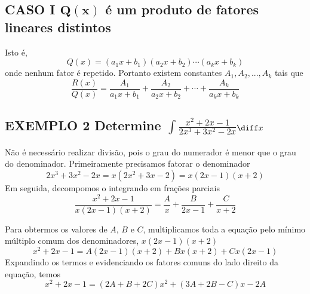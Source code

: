 \documentclass[a4paper, 12pt]{extreport}
\begin{document}
    \vspace{10mm}
    \subsection*{\small CASO I $\mathbf{Q(x)}$ é um produto de fatores lineares distintos}
      \flushleft Isto é, $$ Q(x) = (a_1x + b_1)(a_2x + b_2)\cdots(a_kx + b_k) $$ onde nenhum fator é repetido. Portanto existem constantes
      $A_1, A_2,..., A_k$ tais que
      \begin{equation} \label{eq:r}
        \frac{R(x)}{Q(x)} = \frac{A_1}{a_1x+b_1} + \frac{A_2}{a_2x+b_2} + \cdots + \frac{A_k}{a_kx+b_k}
      \end{equation}

      \subsection*{\small {\color{astral}EXEMPLO 2} \textmd{Determine \large$\int{\frac{x^2+2x-1}{2x^3+3x^2-2x}}$\normalsize$\diff x$}}
        \justifying Não é necessário realizar divisão, pois o grau do numerador é menor que o grau do denominador. Primeiramente precisamos fatorar o denominador
        $$ 2x^3+3x^2-2x = x(2x^2+3x-2) = x(2x-1)(x+2) $$
        Em seguida, decompomos o integrando em frações parciais
        $$ \frac{x^2+2x-1}{x(2x-1)(x+2)} = \frac{A}{x} + \frac{B}{2x-1} + \frac{C}{x+2} $$

        Para obtermos os valores de $A$, $B$ e $C$, multiplicamos toda a equação pelo mínimo múltiplo comum dos denominadores, $x(2x-1)(x+2)$
        $$ x^2+2x-1 = A(2x-1)(x+2) + Bx(x+2) + Cx(2x-1) $$
        Expandindo os termos e evidenciando os fatores comuns do lado direito da equação, temos
        $$ x^2+2x-1 = (2A+B+2C)x^2 + (3A+2B-C)x - 2A $$
\end{document}
